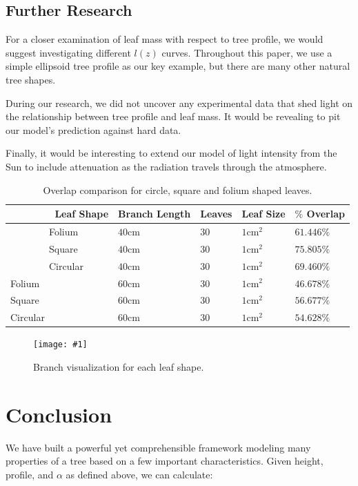 \documentclass[10pt]{article}
\numberwithin{equation}{subsection}
\newlength{\imgwidth}
\newcommand{\scalegraphics}[1]{%
    \settowidth{\imgwidth}{\texttt{[image: \#1]}}%
    \setlength{\imgwidth}{\minof{\imgwidth}{\columnwidth}}%
    \texttt{[image: \#1]}%
}
\begin{document}
\subsection{Further Research}
For a closer examination of leaf mass with respect to tree profile, we
would suggest investigating different $l(z)$ curves. Throughout this
paper, we use a simple ellipsoid tree profile as our key example, but
there are many other natural tree shapes.

During our research, we did not uncover any experimental data that
shed light on the relationship between tree profile and leaf mass. It
would be revealing to pit our model's prediction against hard data. 

Finally, it would be interesting to extend our model of light
intensity from the Sun to include attenuation as the radiation travels
through the atmosphere. 


\begin{table}[h!]
    \begin{tabular}{|l|l|l|l|l|}
        \hline
        Leaf Shape & Branch Length & Leaves & Leaf Size & $\%$ Overlap \\ \hline
        Folium    & $40$cm & 30 & $1 \mathrm{cm}^2$  & $61.446\%$    \\ \hline
        Square & $40$cm & 30 & $1 \mathrm{cm}^2$  & $75.805\%$    \\ \hline
        Circular & $40$cm & 30 & $1 \mathrm{cm}^2$  & $69.460\%$    \\ \hline
        Folium & 60cm & 30 & $1 \mathrm{cm}^2$ & $46.678\%$ \\ \hline
        Square & 60cm & 30 & $1 \mathrm{cm}^2$ & $56.677\%$ \\ \hline
        Circular & 60cm & 30 & $1 \mathrm{cm}^2$ & $54.628\%$ \\ \hline
    \end{tabular}
    \caption{Overlap comparison for circle, square and folium shaped leaves.}
    \label{tab:overlap}
\end{table}

\begin{figure}[h!]
  \centering
  \scalegraphics{img/shapes.png}
  \caption{Branch visualization for each leaf shape.}
  \label{fig:shapes}
\end{figure}

\section{Conclusion}
We have built a powerful yet comprehensible framework modeling many
properties of a tree based on a few important characteristics. Given
height, profile, and $\alpha$ as defined above, we can calculate:
\end{document}
